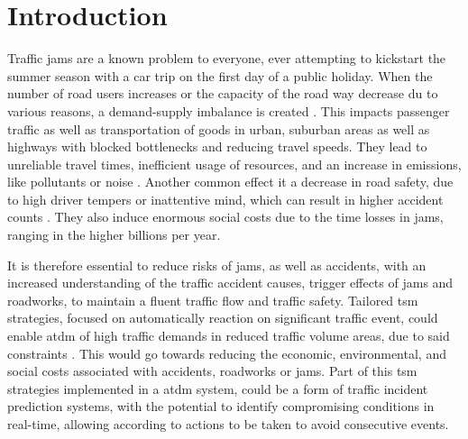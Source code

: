 \documentclass[a4paper,12pt]{report}
\begin{document}
\renewcommand\abstractname{Preliminary information and disclaimers}

\tableofcontents
\thispagestyle{empty}

\chapter{Introduction}
\setcounter{page}{1}
Traffic \glspl{jam} are a known problem to everyone, ever attempting to kickstart the summer season with a car trip on the first day of a public holiday. When the number of road users increases or the capacity of the road way decrease du to various reasons, a demand-supply imbalance is created \cite{Tang2019}. This impacts passenger traffic as well as transportation of goods in urban, suburban areas as well as highways with blocked bottlenecks and reducing travel speeds. They lead to unreliable travel times, inefficient usage of resources, and an increase in emissions, like pollutants or noise \cite{FHA2011}. Another common effect it a decrease in road safety, due to high driver tempers or inattentive mind, which can result in higher accident counts \cite{Sun2016}. They also induce enormous social costs due to the time losses in \glspl{jam}, ranging in the higher billions per year. \cite{RetallackOstendorf2019,BardtFritsch2014,ADAC2019}

It is therefore essential to reduce risks of \glspl{jam}, as well as accidents, with an increased understanding of the traffic accident causes, trigger effects of \glspl{jam} and roadworks, to maintain a fluent traffic flow and traffic safety. Tailored \acrfull{tsm} strategies, focused on automatically reaction on significant traffic event, could enable \acrfull{atdm} of high traffic demands in reduced traffic volume areas, due to said constraints \cite{Tang2019}. This would go towards reducing the economic, environmental, and social costs associated with accidents, roadworks or \glspl{jam}. Part of this \acrshort{tsm} strategies implemented in a \acrshort{atdm} system, could be a form of traffic incident prediction systems, with the potential to identify compromising conditions in real-time, allowing according to actions to be taken to avoid consecutive events. \cite{RetallackOstendorf2019} 
\end{document}
